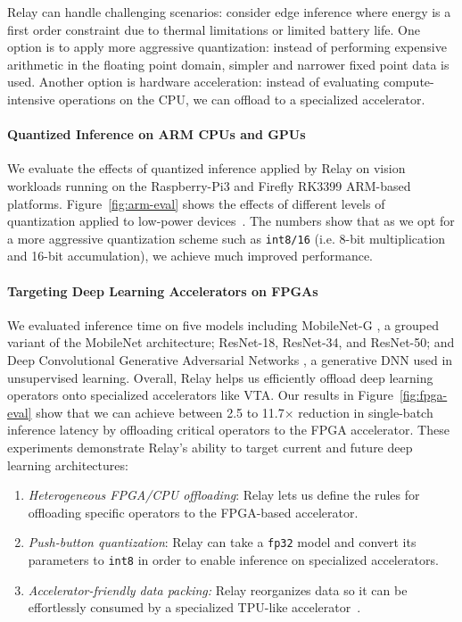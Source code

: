   Relay can handle challenging scenarios: consider edge inference where energy is a first order
    constraint due to thermal limitations or limited battery life.
  One option is to apply more aggressive quantization: instead of performing expensive
    arithmetic in the floating point domain, simpler and narrower fixed point data is used.
  Another option is hardware acceleration: instead of evaluating
    compute-intensive operations on the CPU, we can offload to a specialized accelerator.

  \paragraph{Quantized Inference on ARM CPUs and GPUs}
  We evaluate the effects of quantized inference applied by Relay on vision workloads running
  on the Raspberry-Pi3 and Firefly RK3399 ARM-based platforms.
  Figure~\ref{fig:arm-eval} shows the effects of different levels
    of quantization applied to low-power devices~\citep{roesch2019relay}.
  The numbers show that as we opt for a more aggressive quantization scheme such as \texttt{int8/16} (i.e. 8-bit multiplication and 16-bit accumulation), we achieve much improved performance.

  \paragraph{Targeting Deep Learning Accelerators on FPGAs}
  We evaluated inference time on five models including MobileNet-G \citep{mobilenet}, a grouped variant of the MobileNet architecture; ResNet-18, ResNet-34, and ResNet-50\citep{resnet}; and Deep Convolutional Generative Adversarial Networks \citep{dcgan}, a generative DNN used in unsupervised learning.
  Overall, Relay helps us efficiently offload deep learning operators onto specialized accelerators like VTA.
  Our results in Figure~\ref{fig:fpga-eval} show that we can achieve between 2.5 to 11.7$\times$ reduction in single-batch inference latency by offloading critical operators to the FPGA accelerator.
  These experiments demonstrate Relay's ability to target current and future deep learning architectures:
  \begin{enumerate}
    \item \textit{Heterogeneous FPGA/CPU offloading}: Relay lets us define the rules for offloading specific operators to the FPGA-based accelerator.
    \item \textit{Push-button quantization}: Relay can take a \texttt{fp32} model and convert its parameters to \texttt{int8} in order to enable inference on specialized accelerators.
    \item \textit{Accelerator-friendly data packing:} Relay reorganizes data so it can be effortlessly consumed by a specialized TPU-like accelerator~\citep{tpuv1}.
  \end{enumerate}

